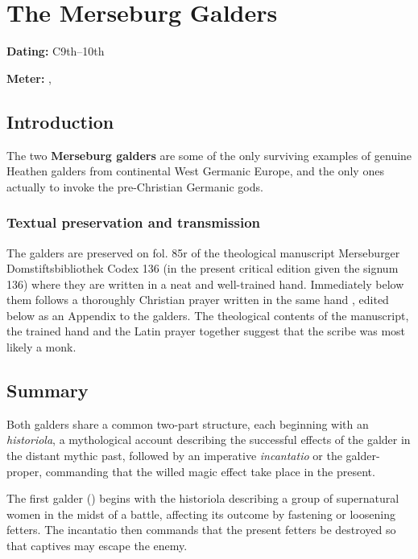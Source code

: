 \section{The Merseburg Galders}\chapterStart{}%

\begin{flushright}%
\textbf{Dating:} C9th--10th

\textbf{Meter:} \Fornyrdislag, \Galdralag%
\end{flushright}

\subsection{Introduction}

The two \textbf{Merseburg galders} are some of the only surviving examples of genuine Heathen galders from continental West Germanic Europe, and the only ones actually to invoke the pre-Christian Germanic gods.

\subsubsection{Textual preservation and transmission}

The galders are preserved on fol. 85r of the theological manuscript Merseburger Domstiftsbibliothek Codex 136 (in the present critical edition given the signum \textup{136}) where they are written in a neat and well-trained hand.  Immediately below them follows a thoroughly Christian prayer written in the same hand \parencite[360]{Murdoch1988}, edited below as an Appendix to the galders.  The theological contents of the manuscript, the trained hand and the Latin prayer together suggest that the scribe was most likely a monk.

\subsection{Summary}

Both galders share a common two-part structure, each beginning with an \emph{historiola}, a mythological account describing the successful effects of the galder in the distant mythic past, followed by an imperative \emph{incantatio} or the galder-proper, commanding that the willed magic effect take place in the present.

The first galder (\MerseburgOne) begins with the historiola describing a group of supernatural women in the midst of a battle, affecting its outcome by fastening or loosening fetters.  The incantatio then commands that the present fetters be destroyed so that captives may escape the enemy.

